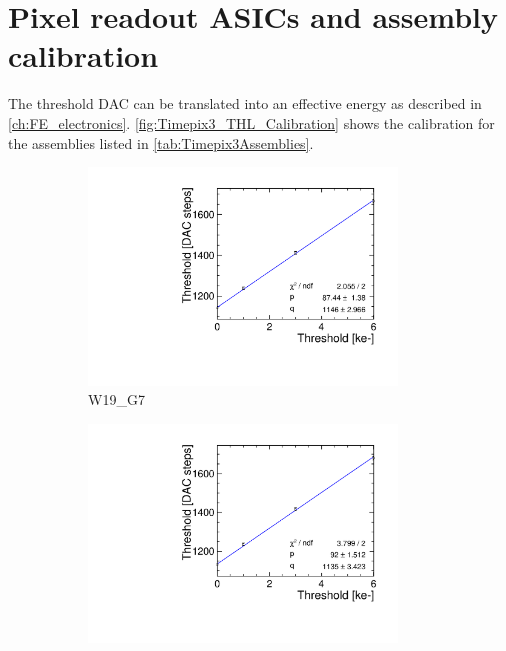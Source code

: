 \chapter{Pixel readout ASICs and assembly calibration}
\label{sec:appendixFE_electronics}

The threshold DAC can be translated into an effective energy as
described in
\cref{ch:FE_electronics}. \cref{fig:Timepix3_THL_Calibration} shows
the calibration for the assemblies listed in
\cref{tab:Timepix3Assemblies}.

\begin{figure}[htbp] \centering
  \begin{subfigure}[b]{0.45\textwidth}
    \includegraphics[width=0.9\textwidth]{./figures/Calibration/THLcalibration_W0019_G07.pdf}
    \caption{W19\_G7}
  \end{subfigure} \hfill
  \begin{subfigure}[b]{0.45\textwidth}
    \includegraphics[width=0.9\textwidth]{./figures/Calibration/THLcalibration_W0019_F07.pdf}

\end{subfigure}
\end{figure}
